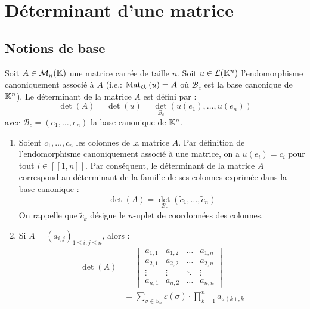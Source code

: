 \documentclass[12pt, a4paper]{report}
\begin{document}
\chapter{Déterminant d'une matrice}

\section{Notions de base}

\begin{definition}
    Soit $A \in \mathcal M_n(\mathbb{K})$ une matrice carrée de taille $n$. Soit $u \in \mathcal L(\mathbb{K}^n)$ l'endomorphisme canoniquement associé à $A$ (i.e.: $\mathrm{Mat}_{\mathcal B_c}(u) = A$ où $\mathcal{B}_c$ est la base canonique de $\mathbb{K}^n$). Le déterminant de la matrice $A$ est défini par :
    $$\det(A) = \det(u) = \det_{\mathcal{B}_c}(u(e_1), \ldots, u(e_n))$$
    avec $\mathcal {B}_c = (e_1, \ldots, e_n)$ la base canonique de $\mathbb{K}^n$.
\end{definition}

\begin{remark}
    \begin{enumerate}
        \item Soient $c_1, \dots, c_n$ les colonnes de la matrice $A$. Par définition de l'endomorphisme canoniquement associé à une matrice, on a $u(e_i) = c_i$ pour tout $i \in [\![1,n]\!]$. Par conséquent, le déterminant de la matrice $A$ correspond au déterminant de la famille de ses colonnes exprimée dans la base canonique :
        $$\det(A) = \det_{\mathcal{B}_c}(\tilde c_1, \dots, \tilde c_n)$$
        On rappelle que $\tilde c_k$ désigne le $n$-uplet de coordonnées des colonnes.
        \item Si $A = (a_{i,j})_{1 \le i,j \le n}$, alors :
        \begin{align*}
            \det(A) &= \begin{vmatrix} a_{1,1} & a_{1,2} & \dots & a_{1,n} \\ a_{2,1} & a_{2,2} & \dots & a_{2,n} \\ \vdots & \vdots & \ddots & \vdots \\ a_{n,1} & a_{n,2} & \dots & a_{n,n} \end{vmatrix} \\
            &= \sum_{\sigma \in S_n} \varepsilon(\sigma) \cdot \prod_{k=1}^{n} a_{\sigma(k), k}
        \end{align*}
    \end{enumerate}
\end{remark}
\end{document}
